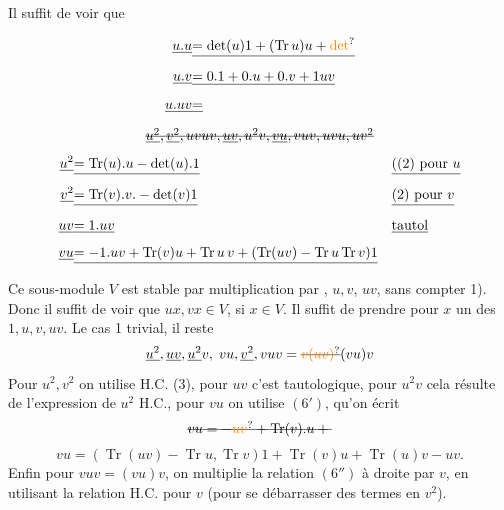 Il suffit de voir que 

\[\begin{aligned}
\deleted{u.u}&\deleted{=\det(u)1+(\operatorname{Tr}u)u+\unsure{\det}}\\
\deleted{u.v}&\deleted{=0.1+0.u+0.v+1uv}\\
\deleted{u.uv}&\deleted{=}
\end{aligned}\]
\[ \deleted{\underline{u^2},\underline{v^2},uvuv,\underline{uv},u^2v,\underline{vu},vuv,uvu,uv^2} \]
\[\begin{aligned}
\deleted{u^2}&\deleted{=\operatorname{Tr}(u).u-\det(u).1}&&\deleted{\text{((2) pour }u}\\
\deleted{v^2}&\deleted{=\operatorname{Tr}(v).v.-\det(v)1}&&\deleted{\text{(2) pour }v}\\
\deleted{uv}&\deleted{=1.uv}&&\deleted{\text{tautol}}\\
\deleted{vu}&\deleted{=-1.uv+\operatorname{Tr}(v)u+\operatorname{Tr}u\,v+(\operatorname{Tr}(uv)-\operatorname{Tr}u\operatorname{Tr}v)1}
\end{aligned}\]
Ce sous-module $V$ est stable par multiplication  par , $u,v$,   $uv$, sans compter 1). Donc il suffit de voir que $ux,vx\in V$, si $x\in V$. Il suffit de prendre pour $x$ un des  $1,u,v,uv$. Le cas 1  trivial, il reste
\[ \underline{u^2},\underline{uv},\underline{u^2}v,\;vu,\underline{v^2},vuv=\deleted{\unsure{v(uv)}}(vu)v \]
Pour $u^2,v^2$ on utilise H.C. (3), pour $uv$ c'est tautologique, pour $u^2v$ cela résulte de l'expression de $u^2$ H.C., pour $vu$ on utilise $(6')$, qu'on écrit
\[ \deleted{vu=-\unsure{uv}+\operatorname{Tr}(v).u+{}} \]
\[ vu=(\operatorname{Tr}(uv)-\operatorname{Tr}u,\operatorname{Tr}v)1+\operatorname{Tr}(v)u+\operatorname{Tr}(u)v-uv. \tag*{$(6'')$} \]
Enfin pour  $vuv=(vu)v$, on multiplie la relation $(6'')$ à droite par $v$, en utilisant la relation H.C. pour $v$ (pour se débarrasser des termes en $v^2$).

